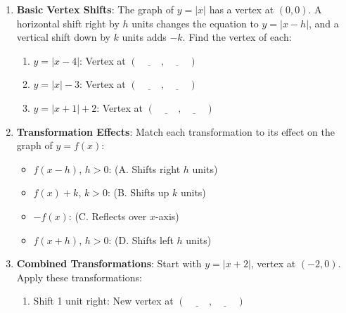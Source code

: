\documentclass[12pt]{article}
\begin{document}
\begin{enumerate}[label=1.\arabic*]
    \item \textbf{Basic Vertex Shifts}: The graph of \( y = |x| \) has a vertex at \( (0, 0) \). A horizontal shift right by \( h \) units changes the equation to \( y = |x - h| \), and a vertical shift down by \( k \) units adds \( -k \). Find the vertex of each:
    \begin{enumerate}[label=\alph*)]
        \item \( y = |x - 4| \): Vertex at \( (\underline{\hspace{1cm}}, \underline{\hspace{1cm}}) \)
        \item \( y = |x| - 3 \): Vertex at \( (\underline{\hspace{1cm}}, \underline{\hspace{1cm}}) \)
        \item \( y = |x + 1| + 2 \): Vertex at \( (\underline{\hspace{1cm}}, \underline{\hspace{1cm}}) \)
    \end{enumerate}
    \item \textbf{Transformation Effects}: Match each transformation to its effect on the graph of \( y = f(x) \):
    \begin{itemize}
        \item \( f(x - h) \), \( h > 0 \): \underline{\hspace{3cm}} (A. Shifts right \( h \) units)
        \item \( f(x) + k \), \( k > 0 \): \underline{\hspace{3cm}} (B. Shifts up \( k \) units)
        \item \( -f(x) \): \underline{\hspace{3cm}} (C. Reflects over \( x \)-axis)
        \item \( f(x + h) \), \( h > 0 \): \underline{\hspace{3cm}} (D. Shifts left \( h \) units)
    \end{itemize}
    \item \textbf{Combined Transformations}: Start with \( y = |x + 2| \), vertex at \( (-2, 0) \). Apply these transformations:
    \begin{enumerate}[label=\alph*)]
        \item Shift 1 unit right: New vertex at \( (\underline{\hspace{1cm}}, \underline{\hspace{1cm}}) \)

\end{enumerate}
\end{enumerate}
\end{document}
